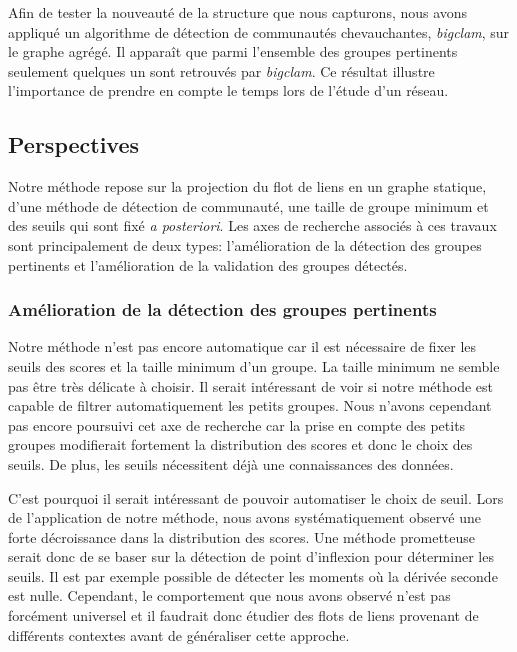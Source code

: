 Afin de tester la nouveauté de la structure que nous capturons, nous avons appliqué un algorithme de détection de communautés chevauchantes, \emph{bigclam}, sur le graphe agrégé.
Il apparaît que parmi l'ensemble des groupes pertinents seulement quelques un sont retrouvés par \emph{bigclam}.
Ce résultat illustre l'importance de prendre en compte le temps lors de l'étude d'un réseau.


\subsection{Perspectives}

Notre méthode repose sur la projection du flot de liens en un graphe statique, d'une méthode de détection de communauté, une taille de groupe minimum et des seuils qui sont fixé \emph{a posteriori}.
Les axes de recherche associés à ces travaux sont principalement de deux types: l'amélioration de la détection des groupes pertinents et l'amélioration de la validation des groupes détectés.

\subsubsection{Amélioration de la détection des groupes pertinents}
Notre méthode n'est pas encore automatique car il est nécessaire de fixer les seuils des scores et la taille minimum d'un groupe.
La taille minimum ne semble pas être très délicate à choisir.
Il serait intéressant de voir si notre méthode est capable de filtrer automatiquement les petits groupes.
Nous n'avons cependant pas encore poursuivi cet axe de recherche car la prise en compte des petits groupes modifierait fortement la distribution des scores et donc le choix des seuils.
De plus, les seuils nécessitent déjà une connaissances des données.

C'est pourquoi il serait intéressant de pouvoir automatiser le choix de seuil.
Lors de l'application de notre méthode, nous avons systématiquement observé une forte décroissance dans la distribution des scores.
Une méthode prometteuse serait donc de se baser sur la détection de point d'inflexion pour déterminer les seuils.
Il est par exemple possible de détecter les moments où la dérivée seconde est nulle.
Cependant, le comportement que nous avons observé n'est pas forcément universel et il faudrait donc étudier des flots de liens provenant de différents contextes avant de généraliser cette approche.


